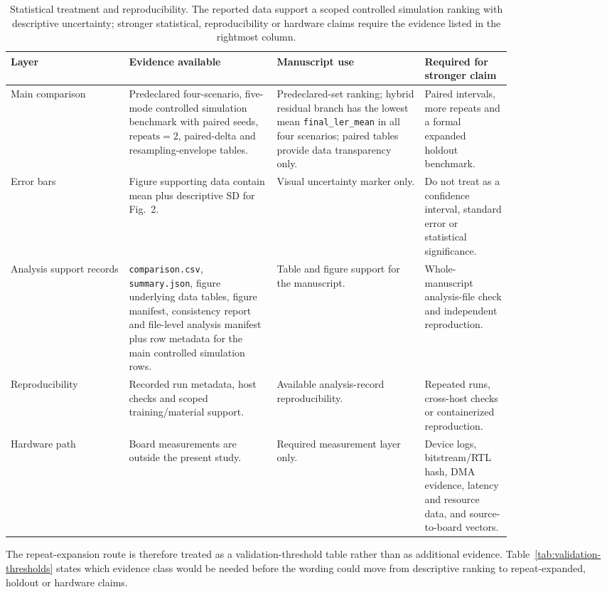 \documentclass[11pt]{article}
\newcommand{\softwarehil}{controlled simulation}
\newcommand{\finalLER}{\texttt{final\_ler\_mean}}
\begin{document}
\begin{table}[htbp]
\centering
\small
\begin{tabular}{@{}>{\raggedright\arraybackslash}p{0.20\linewidth}>{\raggedright\arraybackslash}p{0.25\linewidth}>{\raggedright\arraybackslash}p{0.25\linewidth}>{\raggedright\arraybackslash}p{0.12\linewidth}@{}}
\toprule
Layer & Evidence available & Manuscript use & Required for stronger claim \\
\midrule
Main comparison & Predeclared four-scenario, five-mode \softwarehil{} benchmark
with paired seeds, \(\mathrm{repeats}=2\), paired-delta and resampling-envelope
tables. & Predeclared-set ranking; hybrid residual branch has the lowest mean
\finalLER{} in all four scenarios; paired tables provide data
transparency only. &
Paired intervals, more repeats and a formal expanded holdout benchmark. \\
Error bars & Figure supporting data contain mean plus descriptive SD for Fig.~2.
& Visual uncertainty marker only. & Do not treat as a confidence interval, standard error or
statistical significance. \\
\addlinespace
Analysis support records & \texttt{comparison.csv}, \texttt{summary.json}, figure
underlying data tables, figure manifest, consistency report and file-level
analysis manifest plus row metadata for the main
\softwarehil{} rows. & Table and figure support for the
manuscript. & Whole-manuscript analysis-file check and independent
reproduction. \\
\addlinespace
Reproducibility & Recorded run metadata, host checks and scoped
training/material support. & Available analysis-record reproducibility. &
Repeated runs, cross-host checks or containerized reproduction. \\
\addlinespace
Hardware path & Board measurements are outside the present study. & Required measurement
layer only. & Device logs, bitstream/RTL hash, DMA evidence, latency and
resource data, and source-to-board vectors. \\
\bottomrule
\end{tabular}
\caption{Statistical treatment and reproducibility.  The reported data
support a scoped \softwarehil{} ranking with descriptive uncertainty; stronger
statistical, reproducibility or hardware claims require the evidence
listed in the rightmost column.}
\label{tab:stat-repro-boundary}
\end{table}

The repeat-expansion route is therefore treated as a validation-threshold table
rather than as additional evidence.  Table~\ref{tab:validation-thresholds} states
which evidence class would be needed before the wording could move from
descriptive ranking to repeat-expanded, holdout or hardware claims.
\end{document}

